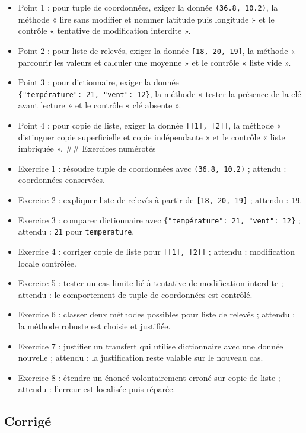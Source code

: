 \begin{itemize}
\tightlist
\item
  Point 1 : pour tuple de coordonnées, exiger la donnée
  \texttt{(36.8,\ 10.2)}, la méthode « lire sans modifier et nommer
  latitude puis longitude » et le contrôle « tentative de modification
  interdite ».
\item
  Point 2 : pour liste de relevés, exiger la donnée
  \texttt{{[}18,\ 20,\ 19{]}}, la méthode « parcourir les valeurs et
  calculer une moyenne » et le contrôle « liste vide ».
\item
  Point 3 : pour dictionnaire, exiger la donnée
  \texttt{\{"température":\ 21,\ "vent":\ 12\}}, la méthode « tester la
  présence de la clé avant lecture » et le contrôle « clé absente ».
\item
  Point 4 : pour copie de liste, exiger la donnée
  \texttt{{[}{[}1{]},\ {[}2{]}{]}}, la méthode « distinguer copie
  superficielle et copie indépendante » et le contrôle « liste imbriquée
  ». \#\# Exercices numérotés
\item
  Exercice 1 : résoudre tuple de coordonnées avec \texttt{(36.8,\ 10.2)}
  ; attendu : coordonnées conservées.
\item
  Exercice 2 : expliquer liste de relevés à partir de
  \texttt{{[}18,\ 20,\ 19{]}} ; attendu : \texttt{19}.
\item
  Exercice 3 : comparer dictionnaire avec
  \texttt{\{"température":\ 21,\ "vent":\ 12\}} ; attendu : \texttt{21}
  pour \texttt{temperature}.
\item
  Exercice 4 : corriger copie de liste pour
  \texttt{{[}{[}1{]},\ {[}2{]}{]}} ; attendu : modification locale
  contrôlée.
\item
  Exercice 5 : tester un cas limite lié à tentative de modification
  interdite ; attendu : le comportement de tuple de coordonnées est
  contrôlé.
\item
  Exercice 6 : classer deux méthodes possibles pour liste de relevés ;
  attendu : la méthode robuste est choisie et justifiée.
\item
  Exercice 7 : justifier un transfert qui utilise dictionnaire avec une
  donnée nouvelle ; attendu : la justification reste valable sur le
  nouveau cas.
\item
  Exercice 8 : étendre un énoncé volontairement erroné sur copie de
  liste ; attendu : l'erreur est localisée puis réparée.
\end{itemize}

\subsection{Corrigé}

